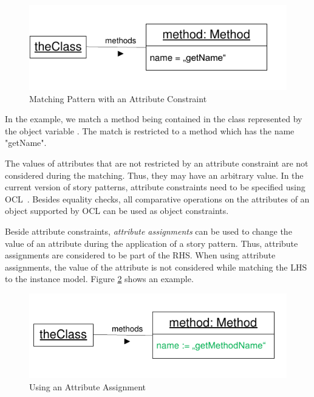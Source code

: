 \begin{figure}[htbp]
  \centering
  \includegraphics[scale=1]{figures/ObjectConstraint}
  \caption{Matching Pattern with an Attribute Constraint}
  \label{fig:objectConstraint}
\end{figure}

In the example, we match a method being contained in the class represented by the object variable . 
The match is restricted to a method which has the name "getName".

The values of attributes that are not restricted by an attribute constraint are not considered during the matching. 
Thus, they may have an arbitrary value. 
In the current version of story patterns, attribute constraints need to be specified using OCL~\cite{OCL}. 
Besides equality checks, all comparative operations on the attributes of an object supported by OCL can be used as object constraints. 

Beside attribute constraints, \emph{attribute assignments} can be used to change the value of an attribute during the application of a story pattern. 
Thus, attribute assignments are considered to be part of the RHS. 
When using attribute assignments, the value of the attribute is not considered while matching the LHS to the instance model. 
Figure \ref{fig:attributeAssignment} shows an example.

\begin{figure}[htbp]
  \centering
  \includegraphics[scale=1]{figures/AttributeAssignment}
  \caption{Using an Attribute Assignment}
  \label{fig:attributeAssignment}
\end{figure}


